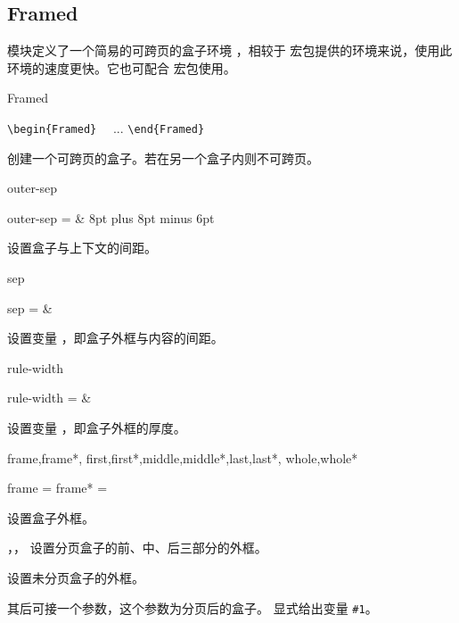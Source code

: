 \documentclass{cusdoc}
\begin{document}
\begin{xample}
\stopxamplecode
\xampleprint
\end{xample}

\subsection{Framed}

 模块定义了一个简易的可跨页的盒子环境 ，相较于 
 宏包提供的环境来说，使用此环境的速度更快。它也可配合 
宏包使用。

\begin{function}[type=environment]{Framed}
  \begin{syntax}
    \verb|\begin{Framed}| 
    ~~... 
    \verb|\end{Framed}|
  \end{syntax}
创建一个可跨页的盒子。若在另一个盒子内则不可跨页。
\end{function}

\begin{keyval}[path=frame]{outer-sep}
  \begin{syntax}
    outer-sep =  & 8pt plus 8pt minus 6pt 
  \end{syntax}
设置盒子与上下文的间距。
\end{keyval}

\begin{keyval}[path=frame]{sep}
  \begin{syntax}
    sep =  & \V{3\fboxsep}
  \end{syntax}
设置变量 ，即盒子外框与内容的间距。
\end{keyval}

\begin{keyval}[path=frame]{rule-width}
  \begin{syntax}
    rule-width =  & \V\fboxrule
  \end{syntax}
设置变量 ，即盒子外框的厚度。
\end{keyval}

\begin{keyval}[path=frame]{frame,frame*,
  first,first*,middle,middle*,last,last*,
  whole,whole*}
  \begin{syntax}
    frame  = 
    frame* = 
  \end{syntax}
 设置盒子外框。

，， 设置分页盒子的前、中、后三部分的外框。

 设置未分页盒子的外框。

 其后可接一个参数，这个参数为分页后的盒子。
 显式给出变量 \verb|#1|。
\end{keyval}
\end{document}
